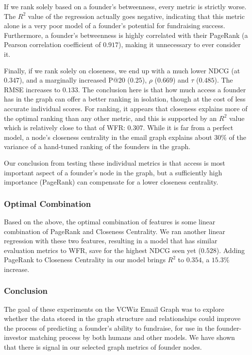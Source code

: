 If we rank solely based on a founder's betweenness, every metric is strictly worse. The $R^2$ value of the regression actually goes negative, indicating that this metric alone is a very poor model of a founder's potential for fundraising success. Furthermore, a founder's betweenness is highly correlated with their PageRank (a Pearson correlation coefficient of $0.917$), making it unnecessary to ever consider it.

Finally, if we rank solely on closeness, we end up with a much lower NDCG (at $0.347$), and a marginally increased P@20 ($0.25$), $\rho$ ($0.669$) and $\tau$ ($0.485$). The RMSE increases to $0.133$. The conclusion here is that how much access a founder has in the graph can offer a better ranking in isolation, though at the cost of less accurate individual scores. For ranking, it appears that closeness explains more of the optimal ranking than any other metric, and this is supported by an $R^2$ value which is relatively close to that of WFR: $0.307$. While it is far from a perfect model, a node's closeness centrality in the email graph explains about 30\% of the variance of a hand-tuned ranking of the founders in the graph.

Our conclusion from testing these individual metrics is that access is most important aspect of a founder's node in the graph, but a sufficiently high importance (PageRank) can compensate for a lower closeness centrality.

\subsubsection{Optimal Combination}

Based on the above, the optimal combination of features is some linear combination of PageRank and Closeness Centrality. We ran another linear regression with these two features, resulting in a model that has similar evaluation metrics to WFR, save for the highest NDCG seen yet ($0.528$). Adding PageRank to Closeness Centrality in our model brings $R^2$ to $0.354$, a $15.3$\% increase.

\subsubsection{Conclusion}

The goal of these experiments on the VCWiz Email Graph was to explore whether the data stored in the graph structure and relationships could improve the process of predicting a founder's ability to fundraise, for use in the founder-investor matching process by both humans and other models. We have shown that there is signal in our selected graph metrics of founder nodes.

